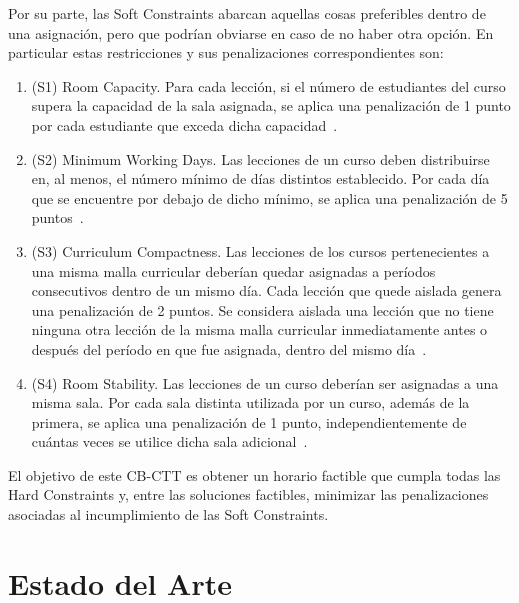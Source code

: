 \documentclass[letter, 10pt]{article}
\begin{document}
Por su parte, las Soft Constraints abarcan aquellas cosas preferibles dentro de una asignaci\'on, pero que podr\'ian obviarse en caso de no haber otra opci\'on. En particular estas restricciones y sus penalizaciones correspondientes son:

\begin{enumerate}
    \item (S1) Room Capacity. Para cada lecci\'on, si el n\'umero de estudiantes del curso supera la capacidad de la sala asignada, se aplica una penalizaci\'on de 1 punto por cada estudiante que exceda dicha capacidad~\cite{Bonutti2012Benchmarking,DiGaspero2007ITC}.
    
    \item (S2) Minimum Working Days. Las lecciones de un curso deben distribuirse en, al menos, el n\'umero m\'inimo de d\'ias distintos establecido. Por cada d\'ia que se encuentre por debajo de dicho m\'inimo, se aplica una penalizaci\'on de 5 puntos~\cite{Bonutti2012Benchmarking,Hao2011LowerBounds,DiGaspero2007ITC}.
    
    \item (S3) Curriculum Compactness. Las lecciones de los cursos pertenecientes a una misma malla curricular deber\'ian quedar asignadas a per\'iodos consecutivos dentro de un mismo d\'ia. Cada lecci\'on que quede aislada genera una penalizaci\'on de 2 puntos. Se considera aislada una lecci\'on que no tiene ninguna otra lecci\'on de la misma malla curricular inmediatamente antes o despu\'es del per\'iodo en que fue asignada, dentro del mismo d\'ia~\cite{Bonutti2012Benchmarking,Hao2011LowerBounds,Ceschia2023Educational,DiGaspero2007ITC}.
    
    \item (S4) Room Stability. Las lecciones de un curso deber\'ian ser asignadas a una misma sala. Por cada sala distinta utilizada por un curso, adem\'as de la primera, se aplica una penalizaci\'on de 1 punto, independientemente de cu\'antas veces se utilice dicha sala adicional~\cite{Bonutti2012Benchmarking,Hao2011LowerBounds,Ceschia2023Educational,DiGaspero2007ITC}.
\end{enumerate}

El objetivo de este CB-CTT es obtener un horario factible que cumpla todas las Hard Constraints y, entre las soluciones factibles, minimizar las penalizaciones asociadas al incumplimiento de las Soft Constraints.



\section{Estado del Arte}
\end{document}
